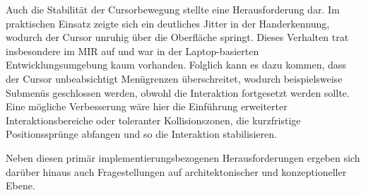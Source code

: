 Auch die Stabilität der Cursorbewegung stellte eine Herausforderung dar. Im praktischen Einsatz zeigte sich ein deutliches Jitter in der Handerkennung, wodurch der Cursor unruhig über die Oberfläche springt. Dieses Verhalten trat insbesondere im MIR auf und war in der Laptop-basierten Entwicklungsumgebung kaum vorhanden. Folglich kann es dazu kommen, dass der Cursor unbeabsichtigt Menügrenzen überschreitet, wodurch beispielsweise Submenüs geschlossen werden, obwohl die Interaktion fortgesetzt werden sollte. Eine mögliche Verbesserung wäre hier die Einführung erweiterter Interaktionsbereiche oder toleranter Kollisionszonen, die kurzfristige Positionssprünge abfangen und so die Interaktion stabilisieren.

Neben diesen primär implementierungsbezogenen Herausforderungen ergeben sich darüber hinaus auch Fragestellungen auf architektonischer und konzeptioneller Ebene.


